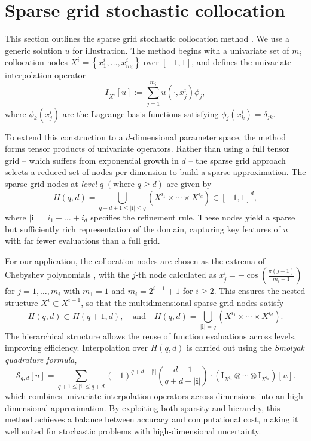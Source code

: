 \section{Sparse grid stochastic collocation}\label{sec:SC}
This section outlines the sparse grid stochastic collocation method \cite{BaNoRi:2000, KlBa:2005, MaNi:2009, Sm:1963}. We use a generic solution $u$ for illustration. 
The method begins with a univariate set of $m_i$ collocation nodes $X^i = \left\{x_1^i,\ldots, x_{m_i}^i\right\}$ over $[-1,1]$, and defines the univariate interpolation operator
%
\[
I_{X^{i}}[u]:=\sum_{j=1}^{m_{i}} u(\cdot, x_j^i)\phi_j,
\]
%
where $\phi_k(x_j^i)$ are the Lagrange basis functions satisfying $\phi_j(x_k^i) = \delta_{jk}$.

To extend this construction to a $d$-dimensional parameter space, the method forms tensor products of univariate operators. Rather than using a full tensor grid -- which suffers from exponential growth in $d$ -- the sparse grid approach selects a reduced set of nodes per dimension to build a sparse approximation. The sparse grid nodes at {\it level} $q\; (\text{where }q\ge d)$ are given by
%
\begin{equation*}
H(q,d) = \bigcup_{q-d+1\le|\boldsymbol{i}|\le q} \left(X^{i_1}\times \cdots\times X^{i_d}\right)\in [-1,1]^d, 
\end{equation*}
%
where $|\boldsymbol{i}| = i_1+\ldots+i_d$ specifies the refinement rule. These nodes yield a sparse but sufficiently rich representation of the domain, capturing key features of $u$ with far fewer evaluations than a full grid.

For our application, the collocation nodes are chosen as the extrema of Chebyshev polynomials \cite{BaNoRi:2000, ClCu:1960}, with the $j$-th node calculated as $x_j^i=-\cos(\frac{ \pi(j-1)}{m_i-1})$ for $j=1, \ldots, m_i$ with $m_1 =1$ and $m_i = 2^{i-1}+1$ for $i\ge 2$.  This ensures the nested structure $X^i\subset X^{i+1}$, so that the multidimensional sparse grid nodes satisfy 
%
\begin{equation}
\label{eq:NestedColPts}
H(q,d)\subset H(q+1,d),\quad \text{and}\quad H(q,d) = \bigcup_{|\boldsymbol{i}|=q} \left(X^{i_1}\times \cdots\times X^{i_d}\right).
\end{equation}
%
The hierarchical structure allows the reuse of function evaluations across levels, improving efficiency. Interpolation over $H(q,d)$  is carried out using the {\it Smolyak quadrature formula}, 
%
\begin{equation}
\label{eq: Smolyak_Quad_formula}
\mathcal{S}_{q, d}[u] = \sum_{q+1\le |\boldsymbol{i}|\le q+d} (-1)^{q+d-|\boldsymbol{i}|} \binom{d-1}{q+d-|\boldsymbol{i}|}\cdot \left(\mathrm I_{X^{i_1}}\otimes\cdots\otimes \mathrm I_{X^{i_d}}\right) [u].
\end{equation} 
%
which combines univariate interpolation operators across dimensions into an high-dimensional approximation. By exploiting both sparsity and hierarchy, this method achieves a balance between accuracy and computational cost, making it well suited for stochastic problems with high-dimensional uncertainty.



